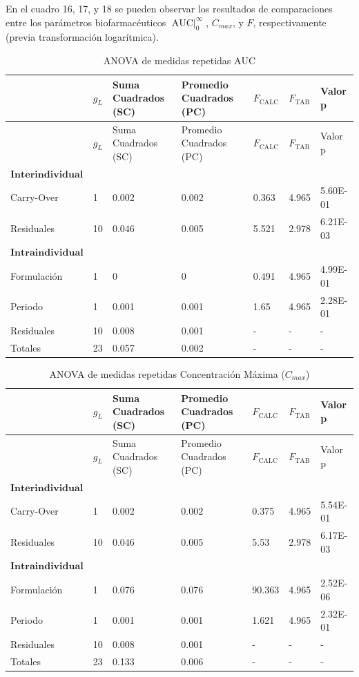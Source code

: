 \documentclass[]{article}
\begin{document}
En el cuadro 16, 17, y 18 se pueden observar los resultados de
comparaciones entre los parámetros biofarmacéuticos
\(\textrm{AUC}\mid _{0}^{\infty}\), \(C_{max}\), y \(F\),
respectivamente (previa transformación logarítmica).

\begin{longtable}[]{@{}lllllll@{}}
\caption{ANOVA de medidas repetidas \(\textrm{AUC}\)}\tabularnewline
\toprule
& \(g_{L}\) & Suma Cuadrados (SC) & Promedio Cuadrados (PC) &
\(F_{\textrm{CALC}}\) & \(F_{\textrm{TAB}}\) & Valor p\tabularnewline
\midrule
\endfirsthead
\toprule
& \(g_{L}\) & Suma Cuadrados (SC) & Promedio Cuadrados (PC) &
\(F_{\textrm{CALC}}\) & \(F_{\textrm{TAB}}\) & Valor p\tabularnewline
\midrule
\endhead
\(\mathbf{\textrm{Interindividual}}\) & & & & & &\tabularnewline
Carry-Over & 1 & 0.002 & 0.002 & 0.363 & 4.965 & 5.60E-01\tabularnewline
Residuales & 10 & 0.046 & 0.005 & 5.521 & 2.978 &
6.21E-03\tabularnewline
\(\mathbf{\textrm{Intraindividual}}\) & & & & & &\tabularnewline
Formulación & 1 & 0 & 0 & 0.491 & 4.965 & 4.99E-01\tabularnewline
Periodo & 1 & 0.001 & 0.001 & 1.65 & 4.965 & 2.28E-01\tabularnewline
Residuales & 10 & 0.008 & 0.001 & - & - & -\tabularnewline
Totales & 23 & 0.057 & 0.002 & - & - & -\tabularnewline
\bottomrule
\end{longtable}

\begin{longtable}[]{@{}lllllll@{}}
\caption{ANOVA de medidas repetidas Concentración Máxima
(\(C_{max}\))}\tabularnewline
\toprule
& \(g_{L}\) & Suma Cuadrados (SC) & Promedio Cuadrados (PC) &
\(F_{\textrm{CALC}}\) & \(F_{\textrm{TAB}}\) & Valor p\tabularnewline
\midrule
\endfirsthead
\toprule
& \(g_{L}\) & Suma Cuadrados (SC) & Promedio Cuadrados (PC) &
\(F_{\textrm{CALC}}\) & \(F_{\textrm{TAB}}\) & Valor p\tabularnewline
\midrule
\endhead
\(\mathbf{\textrm{Interindividual}}\) & & & & & &\tabularnewline
Carry-Over & 1 & 0.002 & 0.002 & 0.375 & 4.965 & 5.54E-01\tabularnewline
Residuales & 10 & 0.046 & 0.005 & 5.53 & 2.978 & 6.17E-03\tabularnewline
\(\mathbf{\textrm{Intraindividual}}\) & & & & & &\tabularnewline
Formulación & 1 & 0.076 & 0.076 & 90.363 & 4.965 &
2.52E-06\tabularnewline
Periodo & 1 & 0.001 & 0.001 & 1.621 & 4.965 & 2.32E-01\tabularnewline
Residuales & 10 & 0.008 & 0.001 & - & - & -\tabularnewline
Totales & 23 & 0.133 & 0.006 & - & - & -\tabularnewline
\bottomrule
\end{longtable}
\end{document}
